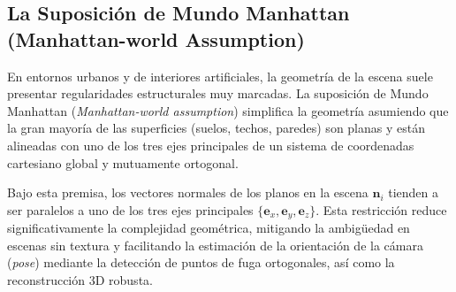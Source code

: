 \subsection{La Suposición de Mundo Manhattan (Manhattan-world Assumption)}
En entornos urbanos y de interiores artificiales, la geometría de la escena suele presentar regularidades estructurales muy marcadas. La suposición de Mundo Manhattan (\textit{Manhattan-world assumption}) \cite{coughlan1999manhattan} simplifica la geometría asumiendo que la gran mayoría de las superficies (suelos, techos, paredes) son planas y están alineadas con uno de los tres ejes principales de un sistema de coordenadas cartesiano global y mutuamente ortogonal.

Bajo esta premisa, los vectores normales de los planos en la escena $\mathbf{n}_i$ tienden a ser paralelos a uno de los tres ejes principales $\{ \mathbf{e}_x, \mathbf{e}_y, \mathbf{e}_z \}$. Esta restricción reduce significativamente la complejidad geométrica, mitigando la ambigüedad en escenas sin textura y facilitando la estimación de la orientación de la cámara (\textit{pose}) mediante la detección de puntos de fuga ortogonales, así como la reconstrucción 3D robusta.